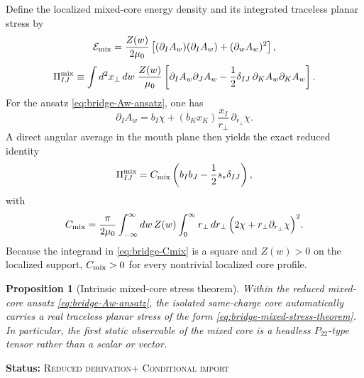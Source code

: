 \documentclass[11pt]{article}
\theoremstyle{plain}
\newtheorem{proposition}[theorem]{Proposition}
\theoremstyle{definition}
\theoremstyle{remark}
\newcommand{\statusReduced}{\textsc{Reduced derivation}}
\newcommand{\statusConditional}{\textsc{Conditional import}}
\newcommand{\claimstatus}[1]{\par\smallskip\noindent\textbf{Status:} #1\par\smallskip}
\newcommand{\Ptwotwo}{P_{22}}
\begin{document}
Define the localized mixed-core energy density and its integrated traceless planar stress by
\begin{equation}
\mathcal E_{\rm mix}
=
\frac{Z(w)}{2\mu_0}
\left[(\partial_I A_w)(\partial_I A_w)+(\partial_w A_w)^2\right],
\label{eq:bridge-mixed-energy-density}
\end{equation}
\begin{equation}
\Pi^{\rm mix}_{IJ}
\equiv
\int d^2x_\perp\,dw\;
\frac{Z(w)}{\mu_0}
\left[
\partial_I A_w\partial_J A_w
-\frac12\delta_{IJ}\,\partial_K A_w\partial_K A_w
\right].
\label{eq:bridge-mixed-stress-def}
\end{equation}
For the ansatz \cref{eq:bridge-Aw-ansatz}, one has
\begin{equation}
\partial_I A_w
=
b_I\chi + (b_Kx_K)\frac{x_I}{r_\perp}\,\partial_{r_\perp}\chi.
\label{eq:bridge-dIw}
\end{equation}
A direct angular average in the mouth plane then yields the exact reduced identity
\begin{equation}
\Pi^{\rm mix}_{IJ}
=
C_{\rm mix}
\left(
 b_I b_J-\frac12 s_*\delta_{IJ}
\right),
\label{eq:bridge-mixed-stress-theorem}
\end{equation}
with
\begin{equation}
C_{\rm mix}
=
\frac{\pi}{2\mu_0}
\int_{-\infty}^{\infty}dw\,Z(w)
\int_0^{\infty}r_\perp\,dr_\perp\,
\Bigl(2\chi+r_\perp\partial_{r_\perp}\chi\Bigr)^2.
\label{eq:bridge-Cmix}
\end{equation}
Because the integrand in \cref{eq:bridge-Cmix} is a square and \(Z(w)>0\) on the localized support, \(C_{\rm mix}>0\) for every nontrivial localized core profile.

\begin{proposition}[Intrinsic mixed-core stress theorem]\label{prop:bridge-mixed-stress}
Within the reduced mixed-core ansatz \cref{eq:bridge-Aw-ansatz}, the isolated same-charge core automatically carries a real traceless planar stress of the form \cref{eq:bridge-mixed-stress-theorem}. In particular, the first static observable of the mixed core is a headless \(\Ptwotwo\)-type tensor rather than a scalar or vector.
\end{proposition}
\claimstatus{\statusReduced + \statusConditional}
\end{document}
